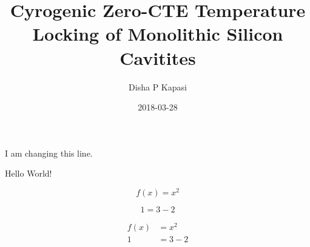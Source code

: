 \documentclass{article}
\title{Cyrogenic Zero-CTE Temperature Locking of Monolithic Silicon Cavitites}
\date{2018-03-28}
\author{Disha P Kapasi}
\begin{document}
    \maketitle
    \newpage
	I am changing this line.
	
	Hello World!
	
	\begin{equation}
	f(x)=x^2
	\end{equation}
	
	\begin{equation}
	1 = 3-2
	\end{equation}
	
	\begin{align}
	f(x)& = x^2 \\
	1 &= 3-2
	\end{align}
\end{document}
